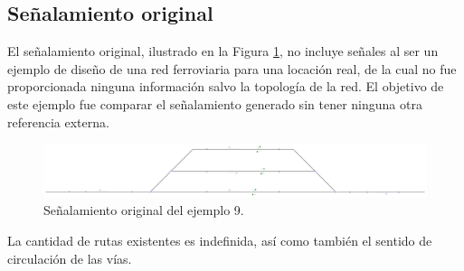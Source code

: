 \subsection{Señalamiento original}

	El señalamiento original, ilustrado en la Figura \ref{fig:EJ9_2}, no incluye señales al ser un ejemplo de diseño de una red ferroviaria para una locación real, de la cual no fue proporcionada ninguna información salvo la topología de la red. El objetivo de este ejemplo fue comparar el señalamiento generado sin tener ninguna otra referencia externa.
	
	\begin{figure}[H]
		\centering
		\includegraphics[width=1\textwidth]{resultados-obtenidos/ejemplo9/images/9_original.png}
		\centering\caption{Señalamiento original del ejemplo 9.}
		\label{fig:EJ9_2}
	\end{figure}
	
	La cantidad de rutas existentes es indefinida, así como también el sentido de circulación de las vías.